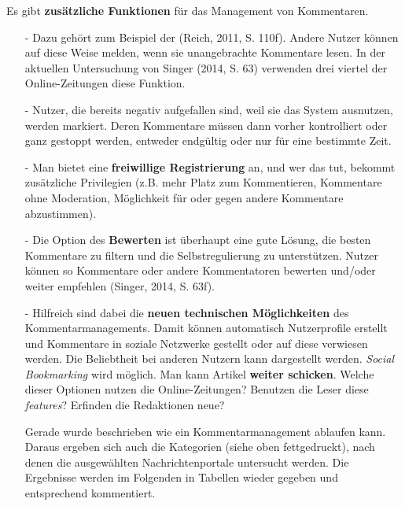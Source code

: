 Es gibt {\bfseries zusätzliche  Funktionen} für das Management von Kommentaren. 
\begin{itemize}
\item[-] Dazu gehört zum Beispiel der  \grqq\- (Reich, 2011, S. 110f). Andere Nutzer können auf diese Weise melden, wenn sie unangebrachte Kommentare lesen. In der aktuellen Untersuchung von Singer (2014, S. 63) verwenden drei viertel der Online-Zeitungen diese Funktion.  
\item[-] Nutzer, die bereits negativ aufgefallen sind, weil sie das System ausnutzen, werden markiert. Deren Kommentare müssen dann vorher kontrolliert oder ganz gestoppt werden, entweder endgültig oder nur für eine bestimmte Zeit. 
\item[-] Man bietet eine  {\bfseries freiwillige Registrierung} an, und wer das tut, bekommt zusätzliche Privilegien (z.B. mehr Platz zum Kommentieren, Kommentare ohne Moderation, Möglichkeit für oder gegen andere Kommentare abzustimmen). 
\item[-] Die Option des  {\bfseries \glqq Bewerten\grqq} ist überhaupt eine gute Lösung, die besten Kommentare zu filtern und die Selbstregulierung zu unterstützen. Nutzer können so Kommentare oder andere Kommentatoren bewerten und/oder weiter empfehlen (Singer, 2014, S. 63f).
 \item[-] Hilfreich sind dabei die {\bfseries neuen technischen Möglichkeiten} des Kommentarmanagements. Damit können
	 automatisch Nutzerprofile erstellt und Kommentare in soziale Netzwerke gestellt oder auf diese verwiesen
	 werden. Die Beliebtheit bei anderen Nutzern kann dargestellt werden. {\slshape Social Bookmarking} wird
	 möglich. Man kann Artikel  {\bfseries weiter schicken}. Welche dieser Optionen nutzen die Online-Zeitungen? Benutzen die Leser diese {\slshape features}? Erfinden die Redaktionen neue?
	 
	 
Gerade wurde beschrieben wie ein Kommentarmanagement ablaufen kann. Daraus ergeben sich auch die Kategorien (siehe oben fettgedruckt), nach denen die ausgewählten Nachrichtenportale untersucht werden. Die Ergebnisse werden im Folgenden in Tabellen wieder gegeben und entsprechend kommentiert. 

\end{itemize}






